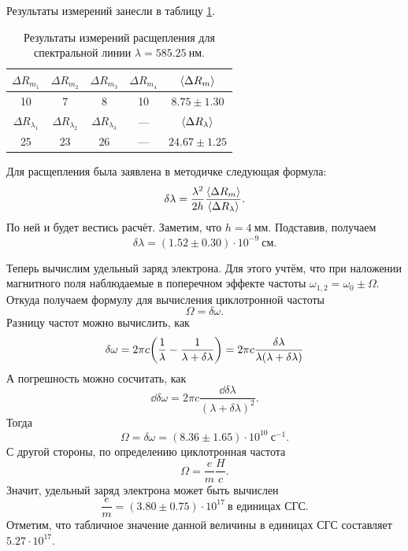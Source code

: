 \documentclass[12pt]{article}
\begin{document}
	Результаты измерений занесли в таблицу \ref{table:5}.
	\begin{table}[h!]
		\centering
		\begin{tabular}{|c c c c | c |} 
 			\hline
 			$\Delta R_{m_1}$ & $\Delta R_{m_2}$ & $\Delta R_{m_3}$ & $\Delta R_{m_4}$ & $\expval{\Delta R_m}$ \\
 			\hline
 			10 & 7 & 8 & 10 & $8.75\pm1.30$ \\
 			\hline\hline
 			$\Delta R_{\lambda_1}$ & $\Delta R_{\lambda_2}$ & $\Delta R_{\lambda_3}$ & \---- & $\expval{\Delta R_\lambda}$ \\
 			\hline
 			25& 23& 26& \---- & $24.67\pm1.25$\\
 			\hline
		\end{tabular}
		\caption{Результаты измерений расщепления для спектральной линии $\lambda = 585.25\ \text{нм}$.}
		\label{table:5}
	\end{table}
	Для расщепления была заявлена в методичке следующая формула:
	\begin{equation}
		\delta\lambda = \dfrac{\lambda^2}{2h}\dfrac{\expval{\Delta R_m}}{\expval{\Delta R_\lambda}}.
	\end{equation}
	По ней и будет вестись расчёт. Заметим, что $h = 4\ \text{мм}$. Подставив, получаем
	\begin{equation}
		\delta\lambda = (1.52\pm0.30 )\cdot 10^{-9}\ \text{см}.
	\end{equation}
	\par Теперь вычислим удельный заряд электрона. Для этого учтём, что при наложении магнитного поля наблюдаемые в поперечном эффекте частоты $\omega_{1,2} = \omega_0 \pm \Omega$. Откуда получаем формулу для вычисления циклотронной частоты
	\begin{equation}
		\Omega = \delta\omega.
	\end{equation}
	Разницу частот можно вычислить, как
	\begin{equation}
		\delta\omega = 2\pi c\qty(\dfrac{1}{\lambda} - \dfrac{1}{\lambda+\delta\lambda}) = 2\pi c \dfrac{\delta\lambda}{\lambda(\lambda+\delta\lambda)}
	\end{equation}
	А погрешность можно сосчитать, как
	\begin{equation}
		\dd{\delta\omega} = 2\pi c \dfrac{\dd{\delta\lambda}}{(\lambda+\delta\lambda)^2}.
	\end{equation}
	Тогда 
	\begin{equation}
		\Omega = \delta\omega = (8.36\pm1.65)\cdot10^{10}\ \text{с}{}^{-1}.
	\end{equation}
	С другой стороны, по определению циклотронная частота 
	\begin{equation}
		\Omega = \dfrac{e}{m} \dfrac{H}{c}.
	\end{equation}
	Значит, удельный заряд электрона может быть вычислен
	\begin{equation}
		\dfrac{e}{m} = (3.80\pm0.75)\cdot10^{17}\ \text{в единицах СГС}.
	\end{equation}
	Отметим, что табличное значение данной величины в единицах СГС составляет $5.27\cdot10^{17}$.
\end{document}
